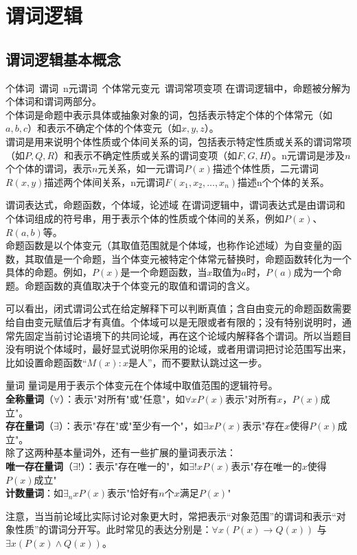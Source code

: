 \chapter{谓词逻辑}
\section{谓词逻辑基本概念}
\begin{definition}{个体词~谓词~n元谓词~个体常元变元~谓词常项变项}{}
在谓词逻辑中，命题被分解为个体词和谓词两部分。\\
个体词是命题中表示具体或抽象对象的词，包括表示特定个体的个体常元（如$a, b, c$）和表示不确定个体的个体变元（如$x, y, z$）。\\
谓词是用来说明个体性质或个体间关系的词，包括表示特定性质或关系的谓词常项（如$P, Q, R$）和表示不确定性质或关系的谓词变项（如$F, G, H$）。n元谓词是涉及$n$个个体的谓词，表示$n$元关系，如一元谓词$P(x)$描述个体性质，二元谓词$R(x,y)$描述两个体间关系，n元谓词$F(x_1,x_2,\ldots,x_n)$描述n个个体的关系。
\end{definition}
\begin{definition}{谓词表达式，命题函数，个体域，论述域}{}
在谓词逻辑中，谓词表达式是由谓词和个体词组成的符号串，用于表示个体的性质或个体间的关系，例如$P(x)$、$R(a, b)$等。\\
命题函数是以个体变元（其取值范围就是个体域，也称作论述域）为自变量的函数，其取值是一个命题，当个体变元被特定个体常元替换时，命题函数转化为一个具体的命题。例如，$P(x)$是一个命题函数，当$x$取值为$a$时，$P(a)$成为一个命题。命题函数的真值取决于个体变元的取值和谓词的含义。
\end{definition}
可以看出，闭式谓词公式在给定解释下可以判断真值；含自由变元的命题函数需要给自由变元赋值后才有真值。个体域可以是无限或者有限的；没有特别说明时，通常先固定当前讨论语境下的共同论域，再在这个论域内解释各个谓词。所以当题目没有明说个体域时，最好显式说明你采用的论域，或者用谓词把讨论范围写出来，比如设置命题函数“$M(x):x$是人”，而不要默认跳过这一步。
\begin{definition}{量词}{}
量词是用于表示个体变元在个体域中取值范围的逻辑符号。\\
\textbf{全称量词}（$\forall$）：表示"对所有"或"任意"，如$\forall x P(x)$表示"对所有$x$，$P(x)$成立"。\\
\textbf{存在量词}（$\exists$）：表示"存在"或"至少有一个"，如$\exists x P(x)$表示"存在$x$使得$P(x)$成立"。\\
除了这两种基本量词外，还有一些扩展的量词表示法：\\
\textbf{唯一存在量词}（$\exists!$）：表示"存在唯一的"，如$\exists! x P(x)$表示"存在唯一的$x$使得$P(x)$成立"\\
\textbf{计数量词}：如$\exists_n x P(x)$表示"恰好有$n$个$x$满足$P(x)$"
\end{definition}
注意，当当前论域比实际讨论对象更大时，常把表示“对象范围”的谓词和表示“对象性质”的谓词分开写。此时常见的表达分别是：$\forall x (P(x) \rightarrow Q(x))$ 与 $\exists x (P(x) \land Q(x))$。

